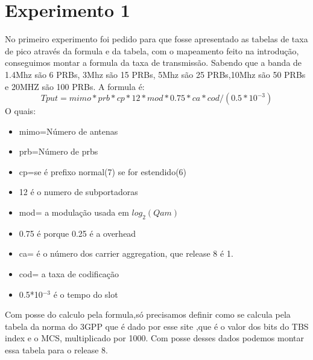 \documentclass[12pt]{article}
\begin{document}
\section{Experimento 1} \label{sec:firstpage}
No primeiro experimento foi pedido para que fosse apresentado as tabelas de taxa de pico através da formula e da tabela, com o mapeamento feito na introdução, conseguimos montar a formula da taxa de transmissão. Sabendo que a banda de 1.4Mhz são 6 PRBs, 3Mhz são 15 PRBs, 5Mhz são 25 PRBs,10Mhz são 50 PRBs e 20MHZ são 100 PRBs\cite{calctab}. A formula é:
\begin{equation}
    Tput=mimo*prb*cp*12*mod*0.75*ca*cod/(0.5*10^{-3})
\end{equation}
O quais:
\begin{itemize}
    \item mimo=Número de antenas
    \item prb=Número de prbs
    \item cp=se é prefixo normal(7) se for estendido(6)
    \item 12 é o numero de subportadoras
    \item mod= a modulação usada em $log_{2}(Qam)$
    \item 0.75 é porque 0.25 é a overhead \cite{Overhead25}
    \item ca= é o número dos carrier aggregation, que release 8 é 1.
    \item cod= a taxa de codificação 
    \item 0.5*10$^{-3}$ é o tempo do slot
\end{itemize}
Com posse do calculo pela formula,só precisamos definir como se calcula pela tabela da norma do 3GPP\cite{ts36213} que é dado por esse site \cite{calctab},que é o valor dos bits do TBS index e o MCS, multiplicado por 1000. Com posse desses dados podemos montar essa tabela para o release 8.
\fontsize{5}{6}\selectfont 
\end{document}
